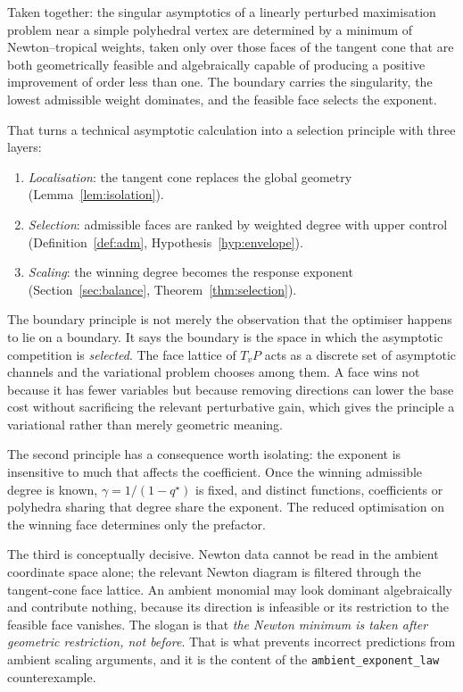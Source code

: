 \documentclass[11pt]{article}
\theoremstyle{definition}
\theoremstyle{remark}
\begin{document}
Taken together: the singular asymptotics of a linearly perturbed maximisation
problem near a simple polyhedral vertex are determined by a minimum of
Newton--tropical weights, taken only over those faces of the tangent cone that
are both geometrically feasible and algebraically capable of producing a
positive improvement of order less than one. The boundary carries the
singularity, the lowest admissible weight dominates, and the feasible face
selects the exponent.

That turns a technical asymptotic calculation into a selection principle with
three layers:
\begin{enumerate}[nosep]
  \item \emph{Localisation}: the tangent cone replaces the global geometry
        (Lemma~\ref{lem:isolation}).
  \item \emph{Selection}: admissible faces are ranked by weighted degree
        with upper control (Definition~\ref{def:adm}, Hypothesis~\ref{hyp:envelope}).
  \item \emph{Scaling}: the winning degree becomes the response exponent
        (Section~\ref{sec:balance}, Theorem~\ref{thm:selection}).
\end{enumerate}

The boundary principle is not merely the observation that the optimiser
happens to lie on a boundary. It says the boundary is the space in which the
asymptotic competition is \emph{selected}. The face lattice of $T_vP$ acts as
a discrete set of asymptotic channels and the variational problem chooses
among them. A face wins not because it has fewer variables but because
removing directions can lower the base cost without sacrificing the relevant
perturbative gain, which gives the principle a variational rather than merely
geometric meaning.

The second principle has a consequence worth isolating: the exponent is
insensitive to much that affects the coefficient. Once the winning admissible
degree is known, $\gamma=1/(1-q^\star)$ is fixed, and distinct functions,
coefficients or polyhedra sharing that degree share the exponent. The reduced
optimisation on the winning face determines only the prefactor.

The third is conceptually decisive. Newton data cannot be read in the ambient
coordinate space alone; the relevant Newton diagram is filtered through the
tangent-cone face lattice. An ambient monomial may look dominant
algebraically and contribute nothing, because its direction is infeasible or
its restriction to the feasible face vanishes. The slogan is that
\emph{the Newton minimum is taken after geometric restriction, not before}.
That is what prevents incorrect predictions from ambient scaling arguments,
and it is the content of the \texttt{ambient\_exponent\_law} counterexample.
\end{document}
